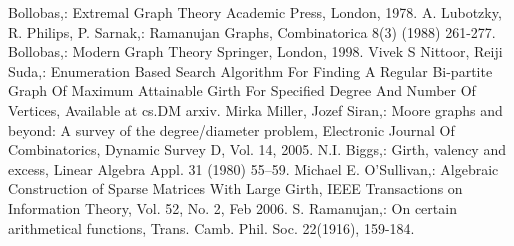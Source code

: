 \documentclass{llncs}
\begin{document}
\begin{thebibliography}{[MT1]}
\bibitem[13]{}
Bollobas,:
Extremal Graph Theory
Academic Press, London, 1978.
\bibitem[14]{}
A. Lubotzky, R. Philips, P. Sarnak,:
Ramanujan Graphs,
Combinatorica 8(3) (1988) 261-277.
\bibitem[15]{}
Bollobas,:
Modern Graph Theory
Springer, London, 1998.
\bibitem[16]{}
Vivek S Nittoor, Reiji Suda,:
Enumeration Based Search Algorithm For Finding A Regular Bi-partite Graph Of Maximum Attainable Girth For Specified Degree And Number Of Vertices,
Available at cs.DM arxiv.
\bibitem[17]{}
Mirka Miller, Jozef Siran,:
Moore graphs and beyond: A survey of the degree/diameter problem,
Electronic Journal Of Combinatorics, Dynamic Survey D, Vol. 14, 2005.
\bibitem[18]{}
N.I. Biggs,:
Girth, valency and excess,
 Linear Algebra Appl. 31 (1980) 55–59.
\bibitem[19]{}
Michael E. O’Sullivan,:
Algebraic Construction of Sparse Matrices With Large Girth,
IEEE Transactions on Information Theory, Vol. 52, No. 2, Feb 2006.
\bibitem[19]{}
S. Ramanujan,:
On certain arithmetical functions,
Trans. Camb. Phil. Soc. 22(1916), 159-184.

\end{thebibliography}
\end{document}
